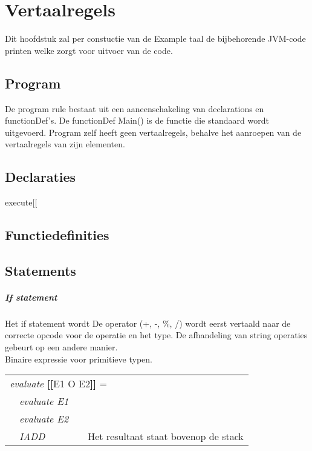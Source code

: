 \chapter{Vertaalregels}
Dit hoofdstuk zal per constuctie van de Example taal de bijbehorende JVM-code printen welke zorgt voor uitvoer van de code.

\section{Program}
De program rule bestaat uit een aaneenschakeling van declarations en functionDef's. De functionDef Main() is de functie die standaard wordt uitgevoerd. Program zelf heeft geen vertaalregels, behalve het aanroepen van de vertaalregels van zijn elementen. 


\newcommand{\vrname}[2]{\textit{#1} \textbf{[[}#2\textbf{]]} =}




\section{Declaraties}
execute[[
\section{Functiedefinities}
\section{Statements}

\paragraph{If statement}
Het if statement wordt De operator (+, -, \%, /) wordt eerst vertaald naar de correcte opcode voor de operatie en het type. De afhandeling van string operaties gebeurt op een andere manier. \\

Binaire expressie voor primitieve typen.\\
{\footnotesize
\begin{tabular}{r l l p{5cm}} %
\multicolumn{4}{l}{\vrname{evaluate}{E1 O E2}} \\
 & \textit{evaluate E1} &  & \\
 & \textit{evaluate E2} &  & \\
 & \textit{IADD}	&	& Het resultaat staat bovenop de stack\\
\end{tabular}
}


